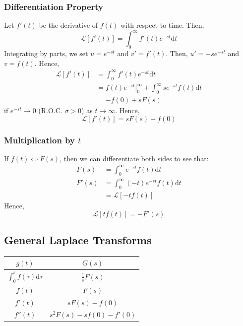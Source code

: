 \documentclass[10pt]{article}
\newcommand{\llra}{\Longleftrightarrow}
\newcommand{\laplace}{\mathcal{L}}
\newcommand{\dd}{\text{d}}
\begin{document}
\subsubsection*{Differentiation Property}
Let $f'(t)$ be the derivative of $f(t)$ with respect to time.  Then,
\[\laplace[f'(t)] = \int_0^\infty f'(t) e^{-st} \dd t\]
Integrating by parts, we set $u = e^{-st}$ and $v' = f'(t)$.  Then, $u' = -se^{-st}$ and $v = f(t)$.  Hence,
\begin{align*}
    \laplace[f'(t)] &= \int_0^\infty f'(t) e^{-st} \dd t\\
    &= f(t) e^{-st}|_0^\infty + \int_0^\infty se^{-st} f(t) \dd t\\
    &= -f(0) + sF(s)
\end{align*}
if $e^{-st} \rightarrow 0$ (R.O.C. $\sigma > 0$) as $t \rightarrow \infty$.  Hence,
\[\boxed{\laplace[f'(t)] = sF(s) - f(0)}\]

\subsubsection*{Multiplication by $t$}
If $f(t) \llra F(s)$, then we can differentiate both sides to see that:
\begin{align*}
    F(s) &= \int_0^\infty e^{-st} f(t) \dd t\\
    F'(s) &= \int_0^\infty (-t)e^{-st} f(t) \dd t\\
    &= \laplace[-t f(t)]
\end{align*}
Hence,
\[\boxed{\laplace[t f(t)] = -F'(s)}\]

\subsection*{General Laplace Transforms}
\begin{center}
\begin{tabular}{|c|c|}
    \hline
    $g(t)$ & $G(s)$\\
    \hline
    $\int_0^t f(\tau) \dd \tau$ & $\frac{1}{s} F(s)$\\
    $f(t)$ & $F(s)$\\
    $f'(t)$ & $sF(s) - f(0)$\\
    $f''(t)$ & $s^2 F(s) - sf(0) - f'(0)$\\
    \hline
\end{tabular}
\end{center}
\end{document}
